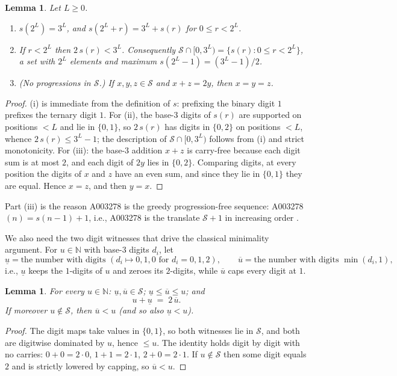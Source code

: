 \documentclass[12pt]{article}
\theoremstyle{plain}
\newtheorem{lemma}[theorem]{Lemma}
\theoremstyle{definition}
\theoremstyle{remark}
\newcommand{\N}{\mathbb{N}}
\newcommand{\Sd}{\mathcal{S}}
\newcommand{\lo}[1]{\underline{#1}}
\newcommand{\hi}[1]{\overline{#1}}
\begin{document}
\begin{lemma}\label{lem:digits}
Let $L\geq 0$.
\begin{enumerate}
\item[(i)] $s(2^L)=3^L$, and $s(2^L+r)=3^L+s(r)$ for $0\leq r<2^L$.
\item[(ii)] If $r<2^L$ then $2\,s(r)<3^L$.  Consequently
$\Sd\cap[0,3^L)=\{s(r):0\leq r<2^L\}$, a set with $2^L$ elements
and maximum $s(2^L-1)=(3^L-1)/2$.
\item[(iii)] (No progressions in $\Sd$.)  If $x,y,z\in\Sd$ and
$x+z=2y$, then $x=y=z$.
\end{enumerate}
\end{lemma}

\begin{proof}
(i) is immediate from the definition of $s$: prefixing the binary
digit $1$ prefixes the ternary digit $1$.  For (ii), the base-$3$
digits of $s(r)$ are supported on positions $<L$ and lie in
$\{0,1\}$, so $2\,s(r)$ has digits in $\{0,2\}$ on positions
$<L$, whence $2\,s(r)\leq 3^L-1$; the description of
$\Sd\cap[0,3^L)$ follows from (i) and strict monotonicity.  For
(iii): the base-$3$ addition $x+z$ is carry-free because each
digit sum is at most $2$, and each digit of $2y$ lies in
$\{0,2\}$.  Comparing digits, at every position the digits of $x$
and $z$ have an even sum, and since they lie in $\{0,1\}$ they
are equal.  Hence $x=z$, and then $y=x$.
\end{proof}

Part (iii) is the reason A003278 is the greedy progression-free
sequence: A003278$(n)=s(n-1)+1$, i.e., A003278 is the translate
$\Sd+1$ in increasing order \cite{OS1978}.

We also need the two digit witnesses that drive the classical
minimality argument.  For $u\in\N$ with base-$3$ digits $d_i$,
let
\[
\lo{u} = \text{the number with digits } (d_i \mapsto 0,1,0
\text{ for } d_i=0,1,2), \qquad
\hi{u} = \text{the number with digits } \min(d_i,1),
\]
i.e., $\lo{u}$ keeps the $1$-digits of $u$ and zeroes its
$2$-digits, while $\hi{u}$ caps every digit at $1$.

\begin{lemma}\label{lem:witness}
For every $u\in\N$: $\lo{u},\hi{u}\in\Sd$;
$\lo{u}\leq\hi{u}\leq u$; and
\[
u+\lo{u} \;=\; 2\,\hi{u}.
\]
If moreover $u\notin\Sd$, then $\hi{u}<u$ (and so also
$\lo{u}<u$).
\end{lemma}

\begin{proof}
The digit maps take values in $\{0,1\}$, so both witnesses lie in
$\Sd$, and both are digitwise dominated by $u$, hence $\leq u$.
The identity holds digit by digit with no carries:
$0+0=2\cdot 0$, $1+1=2\cdot 1$, $2+0=2\cdot 1$.  If $u\notin\Sd$
then some digit equals $2$ and is strictly lowered by capping, so
$\hi{u}<u$.
\end{proof}
\end{document}
